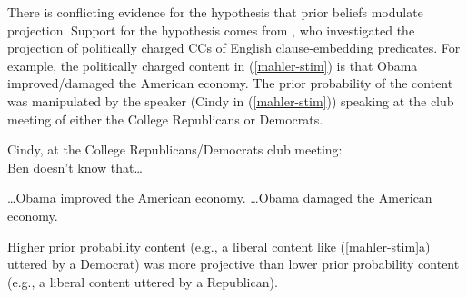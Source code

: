 \documentclass[OpenMind]{stjour}
\begin{document}



%


There is conflicting evidence for the hypothesis that prior beliefs modulate projection. Support for the hypothesis comes from \citet{mahler2020}, who investigated the projection of politically charged CCs of 
English clause-embedding predicates. For example, the politically charged content in (\ref{mahler-stim}) is that Obama improved/damaged the American economy. The prior probability of the content was manipulated by the speaker (Cindy in (\ref{mahler-stim})) speaking at the club meeting of either the College Republicans or Democrats.

\begin{exe}
\ex\label{mahler-stim} Cindy, at the College Republicans/Democrats club meeting: \\ Ben doesn't know that\ldots
\begin{xlist}
\ex \ldots Obama improved the American economy.
\ex \ldots Obama damaged the American economy. \hfill \cite[784f.]{mahler2020}
\end{xlist}
\end{exe}
Higher prior probability content (e.g., a liberal content like (\ref{mahler-stim}a) uttered by a Democrat) was more projective than lower prior probability content (e.g., a liberal content uttered by a Republican). 
\end{document}
